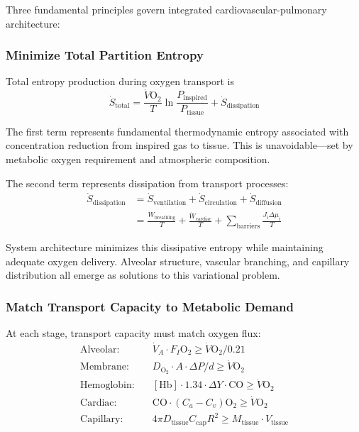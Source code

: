 Three fundamental principles govern integrated cardiovascular-pulmonary architecture:

\subsubsection{Minimize Total Partition Entropy}

Total entropy production during oxygen transport is
\begin{equation}
\dot{S}_{\mathrm{total}} = \frac{\dot{V}\mathrm{O}_{2}}{T}\ln\frac{P_{\mathrm{inspired}}}{P_{\mathrm{tissue}}} + \dot{S}_{\mathrm{dissipation}}
\end{equation}

The first term represents fundamental thermodynamic entropy associated with concentration reduction from inspired gas to tissue. This is unavoidable—set by metabolic oxygen requirement and atmospheric composition.

The second term represents dissipation from transport processes:
\begin{align}
\dot{S}_{\mathrm{dissipation}} &= \dot{S}_{\mathrm{ventilation}} + \dot{S}_{\mathrm{circulation}} + \dot{S}_{\mathrm{diffusion}} \\
&= \frac{\dot{W}_{\mathrm{breathing}}}{T} + \frac{\dot{W}_{\mathrm{cardiac}}}{T} + \sum_{\mathrm{barriers}} \frac{J_{i}\Delta\mu_{i}}{T}
\end{align}

System architecture minimizes this dissipative entropy while maintaining adequate oxygen delivery. Alveolar structure, vascular branching, and capillary distribution all emerge as solutions to this variational problem.

\subsubsection{Match Transport Capacity to Metabolic Demand}

At each stage, transport capacity must match oxygen flux:
\begin{align}
\text{Alveolar:} \quad &\dot{V}_{A} \cdot F_{I}\mathrm{O}_{2} \geq \dot{V}\mathrm{O}_{2}/0.21 \\
\text{Membrane:} \quad &D_{\mathrm{O}_{2}} \cdot A \cdot \Delta P/d \geq \dot{V}\mathrm{O}_{2} \\
\text{Hemoglobin:} \quad &[\mathrm{Hb}] \cdot 1.34 \cdot \Delta Y \cdot \mathrm{CO} \geq \dot{V}\mathrm{O}_{2} \\
\text{Cardiac:} \quad &\mathrm{CO} \cdot (C_{a} - C_{v})\mathrm{O}_{2} \geq \dot{V}\mathrm{O}_{2} \\
\text{Capillary:} \quad &4\pi D_{\mathrm{tissue}} C_{\mathrm{cap}} R^{2} \geq M_{\mathrm{tissue}} \cdot V_{\mathrm{tissue}}
\end{align}

